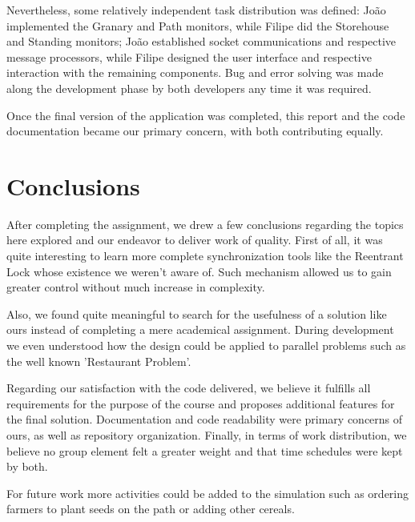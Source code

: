 \documentclass[12pt]{article}
\begin{document}
Nevertheless, some relatively independent task distribution was defined: João implemented the Granary and Path monitors, while Filipe did the Storehouse and 
Standing monitors; João established socket communications and respective message processors, while Filipe designed the user interface and respective interaction
with the remaining components.
Bug and error solving was made along the development phase by both developers any time it was required.

Once the final version of the application was completed, this report and the code documentation became our primary concern, with both contributing equally.

\newpage
\section{Conclusions} %

After completing the assignment, we drew a few conclusions regarding the topics here explored and our endeavor to deliver work of quality.
First of all, it was quite interesting to learn more complete synchronization tools like the Reentrant Lock whose existence we weren't aware of.
Such mechanism allowed us to gain greater control without much increase in complexity.

Also, we found quite meaningful to search for the usefulness of a solution like ours instead of completing a mere academical assignment.
During development we even understood how the design could be applied to parallel problems such as the well known 'Restaurant Problem'.

Regarding our satisfaction with the code delivered, we believe it fulfills all requirements for the purpose of the course and proposes additional features for 
the final solution.
Documentation and code readability were primary concerns of ours, as well as repository organization.
Finally, in terms of work distribution, we believe no group element felt a greater weight and that time schedules were kept by both.

For future work more activities could be added to the simulation such as ordering farmers to plant seeds on the path or adding other cereals.
\end{document}
